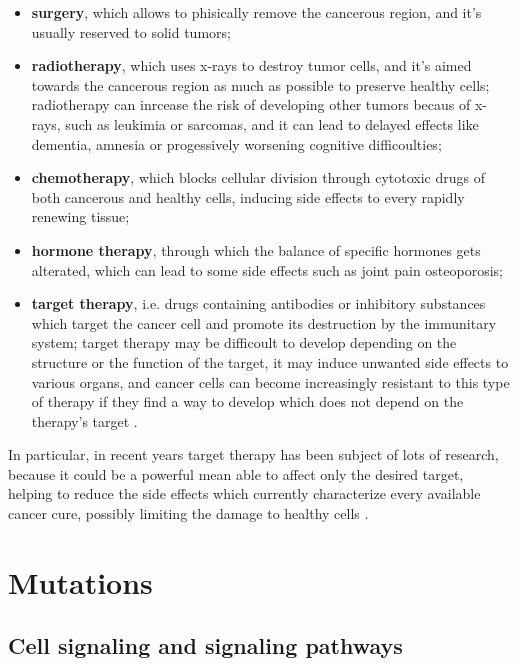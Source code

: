 \begin{itemize}
    \item \textbf{surgery}, which allows to phisically remove the cancerous region, and it's usually reserved to solid tumors;
    \item \textbf{radiotherapy}, which uses x-rays to destroy tumor cells, and it's aimed towards the cancerous region as much as possible to preserve healthy cells; radiotherapy can inrcease the risk of developing other tumors becaus of x-rays, such as leukimia or sarcomas, and it can lead to delayed effects like dementia, amnesia or progessively worsening cognitive difficoulties;
    \item \textbf{chemotherapy}, which blocks cellular division through cytotoxic drugs of both cancerous and healthy cells, inducing side effects to every rapidly renewing tissue;
    \item \textbf{hormone therapy}, through which the balance of specific hormones gets alterated, which can lead to some side effects such as joint pain osteoporosis;
    \item \textbf{target therapy}, i.e. drugs containing antibodies or inhibitory substances which target the cancer cell and promote its destruction by the immunitary system; target therapy may be difficoult to develop depending on the structure or the function of the target, it may induce unwanted side effects to various organs, and cancer cells can become increasingly resistant to this type of therapy if they find a way to develop which does not depend on the therapy's target \cite{target_therapy1} .
\end{itemize}

In particular, in recent years target therapy has been subject of lots of research, because it could be a powerful mean able to affect only the desired target, helping to reduce the side effects which currently characterize every available cancer cure, possibly limiting the damage to healthy cells \cite{target_therapy3}. 

\section{Mutations}

\subsection{Cell signaling and signaling pathways}

